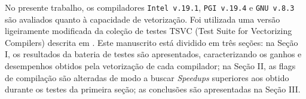 
\begin{resumo}

No presente trabalho, os compiladores \texttt{Intel v.19.1}, \texttt{PGI v.19.4} e \texttt{GNU v.8.3} são avaliados quanto à capacidade de vetorização. Foi utilizada uma versão ligeiramente modificada da coleção de testes TSVC (Test Suite for Vectorizing Compilers) descrita em . Este manuscrito está dividido em três seções: na Seção I, os resultados da bateria de testes são apresentados, caracterizando os ganhos e desempenhos obtidos pela vetorização de cada compilador; na Seção II, as flags de compilação são alteradas de modo a buscar \textit{Speedups} superiores aos obtido durante os testes da primeira seção; as conclusões são apresentadas na Seção III.


\hypertarget{estilo:resumo}{} %

 
\end{resumo}